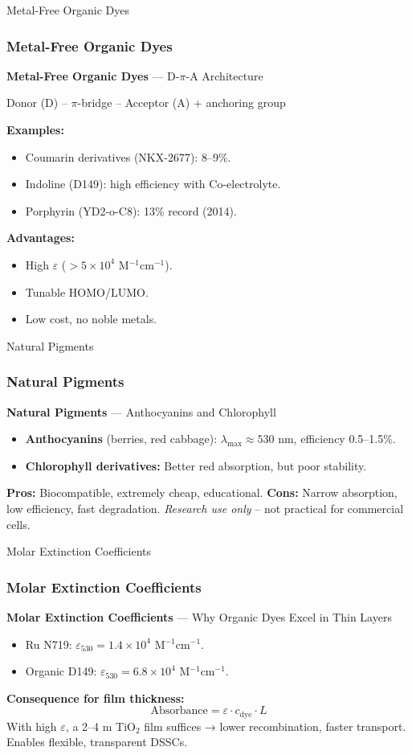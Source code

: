 \documentclass[aspectratio=169]{beamer}
\begin{document}
\begin{frame}{Metal-Free Organic Dyes}
\frametitle{Metal-Free Organic Dyes}

\textbf{Metal-Free Organic Dyes} — D-$\pi$-A Architecture
\begin{center}
Donor (D) – $\pi$-bridge – Acceptor (A) + anchoring group
\end{center}
\textbf{Examples:}
\begin{itemize}
\item Coumarin derivatives (NKX-2677): 8–9\%.
\item Indoline (D149): high efficiency with Co-electrolyte.
\item Porphyrin (YD2-o-C8): 13\% record (2014).
\end{itemize}
\textbf{Advantages:}
\begin{itemize}
\item High $\varepsilon$ ($>5\times10^4$ M$^{-1}$cm$^{-1}$).
\item Tunable HOMO/LUMO.
\item Low cost, no noble metals.
\end{itemize}
\cite{Mishra2009}
\end{frame}


\begin{frame}{Natural Pigments}
\frametitle{Natural Pigments}

\textbf{Natural Pigments} — Anthocyanins and Chlorophyll
\begin{itemize}
\item \textbf{Anthocyanins} (berries, red cabbage): $\lambda_{\max} \approx 530$ nm, efficiency 0.5–1.5\%.
\item \textbf{Chlorophyll derivatives:} Better red absorption, but poor stability.
\end{itemize}
\textbf{Pros:} Biocompatible, extremely cheap, educational.
\textbf{Cons:} Narrow absorption, low efficiency, fast degradation.
\vspace{2mm}
\textit{Research use only} – not practical for commercial cells.
\cite{Calogero2012}
\end{frame}


\begin{frame}{Molar Extinction Coefficients}
\frametitle{Molar Extinction Coefficients}

\textbf{Molar Extinction Coefficients} — Why Organic Dyes Excel in Thin Layers
\begin{itemize}
\item Ru N719: $\varepsilon_{530} = 1.4 \times 10^4$ M$^{-1}$cm$^{-1}$.
\item Organic D149: $\varepsilon_{530} = 6.8 \times 10^4$ M$^{-1}$cm$^{-1}$.
\end{itemize}
\textbf{Consequence for film thickness:}
\[
\text{Absorbance} = \varepsilon \cdot c_{\text{dye}} \cdot L
\]
With high $\varepsilon$, a 2–4 \textmu m TiO$_2$ film suffices → lower recombination, faster transport.
\vspace{2mm}
Enables flexible, transparent DSSCs.
\cite{Grätzel2009}
\end{frame}
\end{document}
